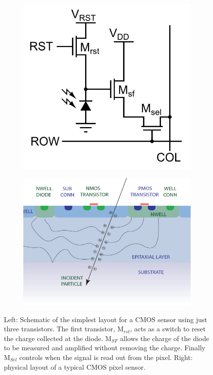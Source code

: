 \begin{figure}
  \centering
  \begin{subfigure}[t]{.45\textwidth}
    \centering
    \includegraphics[width=1\linewidth,keepaspectratio]{DECALStudies/fig/cmos_3Tdesign}
  \end{subfigure}%
  \begin{subfigure}[t]{.45\textwidth}
    \centering
    \includegraphics[width=1\linewidth,keepaspectratio]{DECALStudies/fig/nodeeppwell}
  \end{subfigure}
  \caption{Left: Schematic of the simplest layout for a \ac{CMOS} sensor using just three transistors. The first transistor, M$_{rst}$, acts as a switch to reset the charge collected at the diode. M$_{SF}$ allows the charge of the diode to be measured and amplified without removing the charge. Finally M$_{Sel}$ controls when the signal is read out from the pixel. Right: physical layout of a typical \ac{CMOS} pixel sensor.}
  \label{fig:cmosdesign}
\end{figure}

